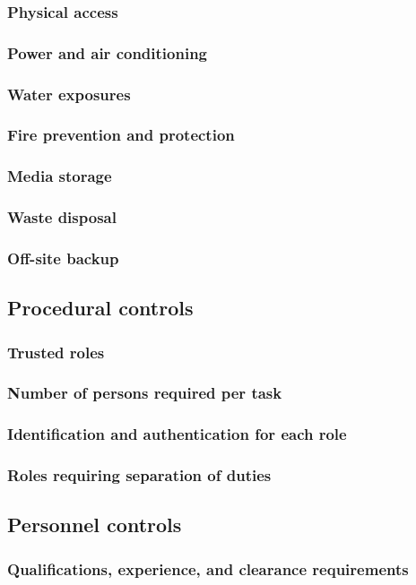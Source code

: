 \documentclass[10pt]{article}
\begin{document}
\subsubsection{Physical access}
\subsubsection{Power and air conditioning}
\subsubsection{Water exposures}
\subsubsection{Fire prevention and protection}
\subsubsection{Media storage}
\subsubsection{Waste disposal}
\subsubsection{Off-site backup}
\subsection{Procedural controls}
\subsubsection{Trusted roles}
\subsubsection{Number of persons required per task}
\subsubsection{Identification and authentication for each role}
\subsubsection{Roles requiring separation of duties}
\subsection{Personnel controls}
\subsubsection{Qualifications, experience, and clearance requirements}
\end{document}
